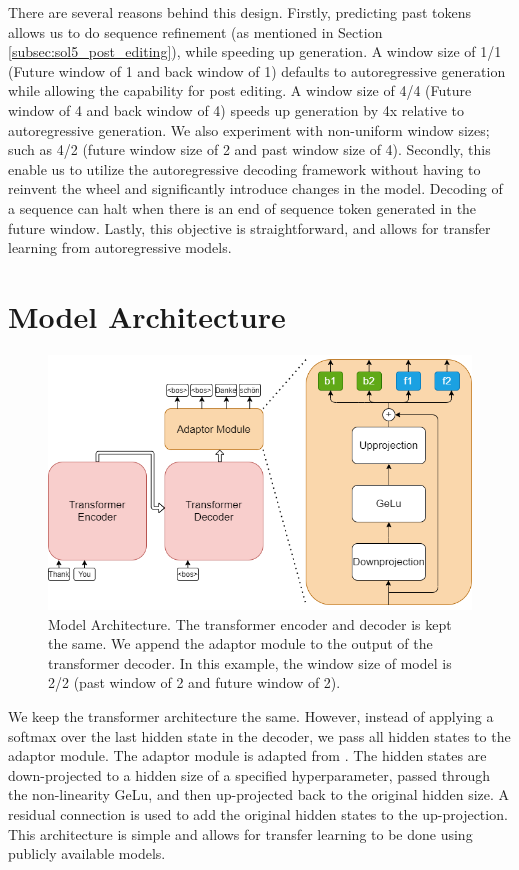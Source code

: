 There are several reasons behind this design. Firstly, predicting past tokens allows us to do sequence refinement (as mentioned in Section \ref{subsec:sol5_post_editing}), while speeding up generation. A window size of 1/1 (Future window of 1 and back window of 1) defaults to autoregressive generation while allowing the capability for post editing. A window size of 4/4 (Future window of 4 and back window of 4) speeds up generation by 4x relative to autoregressive generation. We also experiment with non-uniform window sizes; such as 4/2 (future window size of 2 and past window size of 4). Secondly, this enable us to utilize the autoregressive decoding framework without having to reinvent the wheel and significantly introduce changes in the model. Decoding of a sequence can halt when there is an end of sequence token generated in the future window. Lastly, this objective is straightforward, and allows for transfer learning from autoregressive models.

\section{Model Architecture}\label{sec:architecture}

\begin{figure}[hpbt!]

    \centering
    \includegraphics[width=\textwidth]{images/chap04_images/adaptor_module.png}
    \caption{Model Architecture. The transformer encoder and decoder is kept the same. We append the adaptor module to the output of the transformer decoder. In this example, the window size of model is 2/2 (past window of 2 and future window of 2).}
    \label{fig:AT_vs_NAT}
\end{figure}

We keep the transformer architecture the same. However, instead of applying a softmax over the last hidden state in the decoder, we pass all hidden states to the adaptor module. The adaptor module is adapted from \textcite{houlsby_parameter-efficient_2019_adaptor2}. The hidden states are down-projected to a hidden size of a specified hyperparameter, passed through the non-linearity GeLu, and then up-projected back to the original hidden size. A residual connection is used to add the original hidden states to the up-projection. This architecture is simple and allows for transfer learning to be done using publicly available models.

